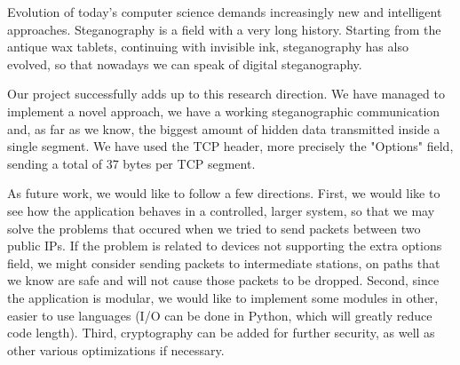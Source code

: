 
Evolution of today's computer science demands increasingly new and intelligent
approaches. Steganography is a field with a very long history. Starting from
the antique wax tablets, continuing with invisible ink, steganography has also
evolved, so that nowadays we can speak of digital steganography.

Our project successfully adds up to this research direction. We have managed to
implement a novel approach, we have a working steganographic communication and,
as far as we know, the biggest amount of hidden data transmitted inside a
single segment. We have used the TCP header, more precisely the "Options"
field, sending a total of 37 bytes per TCP segment.

As future work, we would like to follow a few directions. First, we would like to
see how the application behaves in a controlled, larger system, so that we may solve
the problems that occured when we tried to send packets between two public IPs. If
the problem is related to devices not supporting the extra options field, we might 
consider sending packets to intermediate stations, on paths that we know are safe
and will not cause those packets to be dropped. Second, since the application is modular,
we would like to implement some modules in other, easier to use languages (I/O 
can be done in Python, which will greatly reduce code length). Third, cryptography
can be added for further security, as well as other various optimizations if 
necessary.
